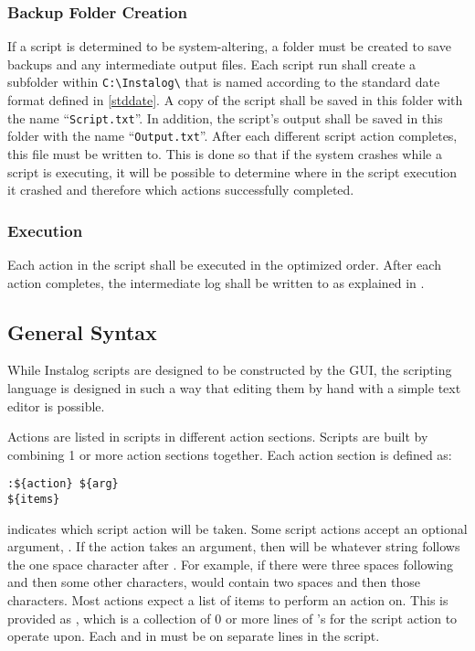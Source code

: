 \subsubsection{Backup Folder Creation} \label{sec:backup_folder}
If a script is determined to be system-altering, a folder must be created to
save backups and any intermediate output files.  Each script run shall create a
subfolder within \verb|C:\Instalog\| that is named according to the standard
date format defined in \ref{stddate}.  A copy of the script shall be saved in
this folder with the name ``\verb|Script.txt|''.  In addition, the script's output
shall be saved in this folder with the name ``\verb|Output.txt|''.  After each
different script action completes, this file must be written to.  This is done
so that if the system crashes while a script is executing, it will be possible
to determine where in the script execution it crashed and therefore which
actions successfully completed.  
\subsubsection{Execution}
Each action in the script shall be executed in the optimized order.  After each
action completes, the intermediate log shall be written to as explained in
\label{sec:backup_folder}.

\subsection{General Syntax}
While Instalog scripts are designed to be constructed by the GUI, the scripting
language is designed in such a way that editing them by hand with a simple text
editor is possible.  

Actions are listed in scripts in different action sections.  Scripts are built
by combining 1 or more action sections together.  Each action section is defined
as:
\begin{verbatim}
:${action} ${arg}
${items}
\end{verbatim}
 indicates which script action will be taken.  Some script actions
accept an optional argument, .  If the action takes an argument,
then  will be whatever string follows the one space character after
.  For example, if there were three spaces following 
and then some other characters,  would contain two spaces and then
those characters.  Most actions expect a list of items to perform an action on. 
This is provided as , which is a collection of 0 or more lines of
's for the script action to operate upon.  Each  and
 in  must be on separate lines in the script.

